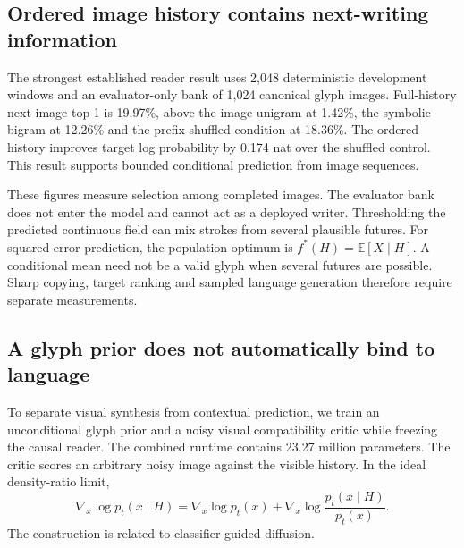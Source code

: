 
\subsection*{Ordered image history contains next-writing information}
The strongest established reader result uses 2,048 deterministic development
windows and an evaluator-only bank of 1,024 canonical glyph images. Full-history
next-image top-1 is 19.97\%, above the image unigram at 1.42\%, the symbolic
bigram at 12.26\% and the prefix-shuffled condition at 18.36\%. The ordered
history improves target log probability by 0.174 nat over the shuffled control.
This result supports bounded conditional prediction from image sequences.

These figures measure selection among completed images. The evaluator bank
does not enter the model and cannot act as a deployed writer. Thresholding
the predicted continuous field can mix strokes from several plausible futures.
For squared-error prediction, the population optimum is
$f^*(H)=\mathbb{E}[X\mid H]$. A conditional mean need not be a valid glyph
when several futures are possible. Sharp copying, target ranking and sampled
language generation therefore require separate measurements.

\subsection*{A glyph prior does not automatically bind to language}
To separate visual synthesis from contextual prediction, we train an
unconditional glyph prior and a noisy visual compatibility critic while
freezing the causal reader. The combined runtime contains 23.27 million
parameters. The critic scores an arbitrary noisy image against the visible
history. In the ideal density-ratio limit,
\begin{equation}
\nabla_x\log p_t(x\mid H)=\nabla_x\log p_t(x)
+\nabla_x\log\frac{p_t(x\mid H)}{p_t(x)}.
\end{equation}
The construction is related to classifier-guided diffusion\cite{guidance}.

